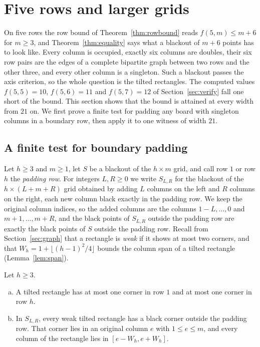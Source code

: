 \section{Five rows and larger grids}\label{sec:five}

On five rows the row bound of Theorem~\ref{thm:rowbound} reads $f(5,m)\le m+6$ for
$m\ge3$, and Theorem~\ref{thm:equality} says what a blackout of $m+6$ points has to look
like. Every column is occupied, exactly six columns are doubles, their six row pairs are the
edges of a complete bipartite graph between two rows and the other three, and every other
column is a singleton. Such a blackout passes the axis criterion, so the whole question is the
tilted rectangles. The computed values $f(5,5)=10$, $f(5,6)=11$ and $f(5,7)=12$ of
Section~\ref{sec:verify} fall one short of the bound. This section shows that the bound is
attained at every width from $21$ on. We first prove a finite test for padding any board with
singleton columns in a boundary row, then apply it to one witness of width $21$.

\subsection{A finite test for boundary padding}

Let $h\ge3$ and $m\ge1$, let $S$ be a blackout of the $h\times m$ grid, and call row $1$ or
row $h$ the \emph{padding row}. For integers $L,R\ge0$ we write $S_{L,R}$ for the blackout of
the $h\times(L+m+R)$ grid obtained by adding $L$ columns on the left and $R$ columns on the
right, each new column black exactly in the padding row. We keep the original column indices,
so the added columns are the columns $1-L,\dots,0$ and $m+1,\dots,m+R$, and the black points of
$S_{L,R}$ outside the padding row are exactly the black points of $S$ outside the padding row.
Recall from Section~\ref{sec:graph} that a rectangle is \emph{weak} if it shows at most two
corners, and that $W_h=1+\lfloor(h-1)^2/4\rfloor$ bounds the column span of a tilted rectangle
(Lemma~\ref{lem:span}).

\begin{lemma}\label{lem:five-local}
Let $h\ge3$.
\begin{enumerate}[(a)]
\item A tilted rectangle has at most one corner in row $1$ and at most one corner in row $h$.
\item In $S_{L,R}$, every weak tilted rectangle has a black corner outside the padding row.
That corner lies in an original column $e$ with $1\le e\le m$, and every column of the
rectangle lies in $[e-W_h,e+W_h]$.
\end{enumerate}
\end{lemma}

